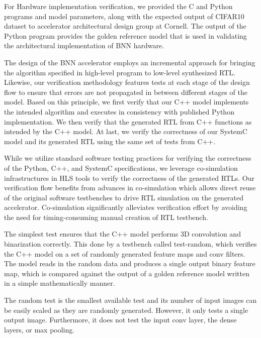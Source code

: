 For Hardware implementation verification, we provided the C and Python
programs and model parameters, along with the expected output of CIFAR10
dataset to accelerator architectural design group at Cornell. The output
of the Python program provides the golden reference model that is used in
validating the architectural implementation of BNN hardware.


The design of the BNN accelerator employs an incremental approach for
bringing the algorithm specified in high-level program to low-level
synthesized RTL. Likewise, our verification methodology features tests at
each stage of the design flow to ensure that errors are not propagated in
between different stages of the model. Based on this principle, we first
verify that our C++ model implements the intended algorithm and executes
in consistency with published Python implementation. We then verify that
the generated RTL from C++ functions as intended by the C++ model. At
last, we verify the correctness of our SystemC model and its generated
RTL using the same set of tests from C++.

While we utilize standard software testing practices for verifying the
correctness of the Python, C++, and SystemC specifications, we leverage
co-simulation infrastructures in HLS tools to verify the correctness of
the generated RTLs. Our verification flow benefits from advances in
co-simulation which allows direct reuse of the original software
testbenches to drive RTL simulation on the generated accelerator.
Co-simulation significantly alleviates verification effort by avoiding
the need for timing-consuming manual creation of RTL testbench.


The simplest test ensures that the C++ model performs 3D convolution and
binarization correctly. This done by a testbench called test-random,
which verifies the C++ model on a set of randomly generated feature maps
and conv filters. The model reads in the random data and produces a
single output binary feature map, which is compared against the output of
a golden reference model written in a simple mathematically manner.

The random test is the smallest available test and its number of input
images can be easily scaled as they are randomly generated. However, it
only tests a single output image. Furthermore, it does not test the input
conv layer, the dense layers, or max pooling.

